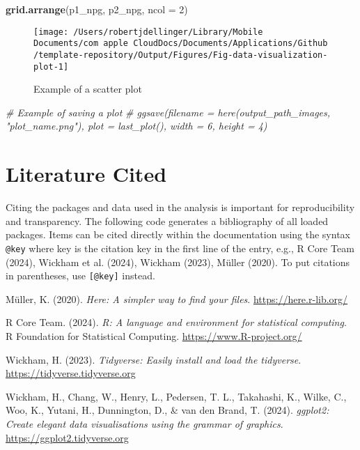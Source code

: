 \documentclass[
  12pt,
]{article}
\newenvironment{Shaded}{\begin{snugshade}}{\end{snugshade}}
\newcommand{\AttributeTok}[1]{\textcolor[rgb]{0.13,0.29,0.53}{#1}}
\newcommand{\CommentTok}[1]{\textcolor[rgb]{0.56,0.35,0.01}{\textit{#1}}}
\newcommand{\DecValTok}[1]{\textcolor[rgb]{0.00,0.00,0.81}{#1}}
\newcommand{\FunctionTok}[1]{\textcolor[rgb]{0.13,0.29,0.53}{\textbf{#1}}}
\newcommand{\NormalTok}[1]{#1}
\newlength{\cslhangindent}
\newenvironment{CSLReferences}[2] %
 {\begin{list}{}{%
  \setlength{\itemindent}{0pt}
  \setlength{\leftmargin}{0pt}
  \setlength{\parsep}{0pt}
  \ifodd #1
   \setlength{\leftmargin}{\cslhangindent}
   \setlength{\itemindent}{-1\cslhangindent}
  \fi
  \setlength{\itemsep}{#2\baselineskip}}}
 {\end{list}}
\begin{document}
\begin{Shaded}
\begin{Highlighting}[]
\FunctionTok{grid.arrange}\NormalTok{(p1\_npg, p2\_npg, }\AttributeTok{ncol =} \DecValTok{2}\NormalTok{)}
\end{Highlighting}
\end{Shaded}

\begin{figure}

{\centering \texttt{[image: /Users/robertjdellinger/Library/Mobile Documents/com~apple~CloudDocs/Documents/Applications/Github/template-repository/Output/Figures/Fig-data-visualization-plot-1]} 

}

\caption{Example of a scatter plot}\label{fig:data-visualization-plot}
\end{figure}

\begin{Shaded}
\begin{Highlighting}[]
\CommentTok{\# Example of saving a plot}
\CommentTok{\# ggsave(filename = here(output\_path\_images, "plot\_name.png"), plot = last\_plot(), width = 6, height = 4)}
\end{Highlighting}
\end{Shaded}

\section{Literature Cited}\label{literature-cited}

Citing the packages and data used in the analysis is important for
reproducibility and transparency. The following code generates a
bibliography of all loaded packages. Items can be cited directly within
the documentation using the syntax \texttt{@key} where key is the
citation key in the first line of the entry, e.g., R Core Team (2024),
Wickham et al. (2024), Wickham (2023), Müller (2020). To put citations
in parentheses, use \texttt{{[}@key{]}} instead.

\label{refs}
\begin{CSLReferences}{1}{0}
Müller, K. (2020). \emph{Here: A simpler way to find your files}.
\url{https://here.r-lib.org/}

R Core Team. (2024). \emph{R: A language and environment for statistical
computing}. R Foundation for Statistical Computing.
\url{https://www.R-project.org/}

Wickham, H. (2023). \emph{Tidyverse: Easily install and load the
tidyverse}. \url{https://tidyverse.tidyverse.org}

Wickham, H., Chang, W., Henry, L., Pedersen, T. L., Takahashi, K.,
Wilke, C., Woo, K., Yutani, H., Dunnington, D., \& van den Brand, T.
(2024). \emph{ggplot2: Create elegant data visualisations using the
grammar of graphics}. \url{https://ggplot2.tidyverse.org}

\end{CSLReferences}
\end{document}
